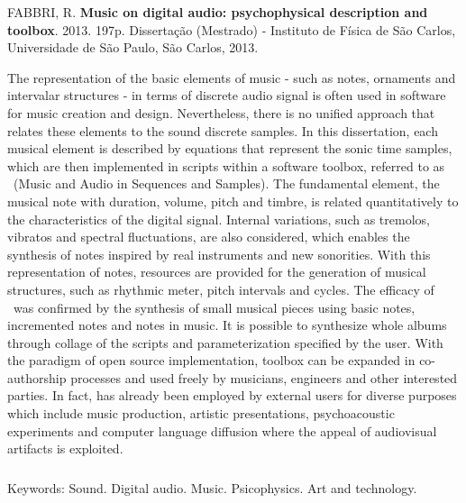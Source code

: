\begin{abstract2}
\vspace{-10mm}
FABBRI, R. \textbf{Music on digital audio: psychophysical description and toolbox}. 2013. 197p. Dissertação (Mestrado) - Instituto de Física de São Carlos, Universidade de São Paulo, São Carlos, 2013.
\vspace{15mm}

The representation of the basic elements of music - such as notes, ornaments and intervalar structures - in terms of discrete audio signal is often used in software for music creation and design. Nevertheless, there is no unified approach that relates these elements to the sound discrete samples. In this dissertation, each musical element is described by equations that represent the sonic time samples, which are then implemented in scripts within a software toolbox, referred to as \massa\ (Music and Audio in Sequences and Samples). The fundamental element, the musical note with duration, volume, pitch and timbre, is related quantitatively to the characteristics of the digital signal. Internal variations, such as tremolos, vibratos and spectral fluctuations, are also considered, which enables the synthesis of notes inspired by real instruments and new sonorities. With this representation of notes, resources are provided for the generation of musical structures, such as rhythmic meter, pitch intervals and cycles. The efficacy of \massa\ was confirmed by the synthesis of small musical pieces using basic notes, incremented notes and notes in music. It is possible to synthesize whole albums through collage of the scripts and parameterization specified by the user. With the paradigm of open source implementation, \massa toolbox can be expanded in co-authorship processes and used freely by musicians, engineers and other interested parties. In fact, \massa has already been employed by external users for diverse purposes which include music production, artistic presentations, psychoacoustic experiments and computer language diffusion where the appeal of audiovisual artifacts is exploited.


$\phantom{linha em branco}$\\
Keywords: Sound. Digital audio. Music. Psicophysics. Art and technology.


\end{abstract2}
